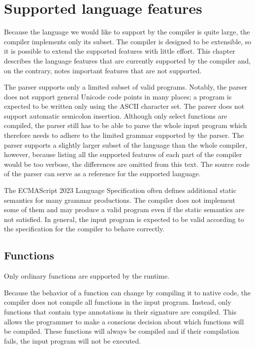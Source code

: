 \chapter{Supported language features}\label{supported_lang}

Because the language we would like to support by the compiler is quite large, the compiler implements only its subset. The compiler is designed to be extensible, so it is possible to extend the supported features with little effort. This chapter describes the language features that are currently supported by the compiler and, on the contrary, notes important features that are not supported.

The parser supports only a limited subset of valid programs. Notably, the parser does not support general Unicode code points in many places; a program is expected to be written only using the ASCII character set. The parser does not support automatic semicolon insertion. Although only select functions are compiled, the parser still has to be able to parse the whole input program which therefore needs to adhere to the limited grammar supported by the parser. The parser supports a slightly larger subset of the language than the whole compiler, however, because listing all the supported features of each part of the compiler would be too verbose, the differences are omitted from this text. The source code of the parser can serve as a reference for the supported language.

The ECMAScript 2023 Language Specification\cite{ecma262} often defines additional static semantics for many grammar productions. The compiler does not implement some of them and may produce a valid program even if the static semantics are not satisfied. In general, the input program is expected to be valid according to the specification for the compiler to behave correctly.


\section{Functions}

Only ordinary functions are supported by the runtime.

Because the behavior of a function can change by compiling it to native code, the compiler does not compile all functions in the input program. Instead, only functions that contain type annotations in their signature are compiled. This allows the programmer to make a conscious decision about which functions will be compiled. These functions will always be compiled and if their compilation fails, the input program will not be executed.

